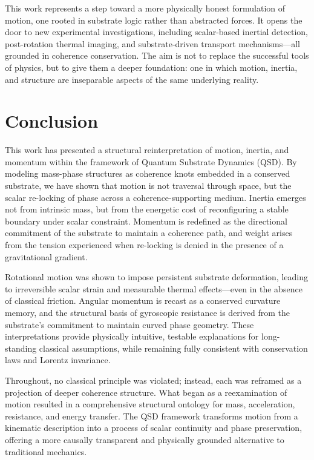 \documentclass[entropy,article,submit,pdftex,moreauthors]{Definitions/mdpi}
\begin{document}
This work represents a step toward a more physically honest formulation of motion, one rooted in substrate logic rather than abstracted forces. It opens the door to new experimental investigations, including scalar-based inertial detection, post-rotation thermal imaging, and substrate-driven transport mechanisms—all grounded in coherence conservation. The aim is not to replace the successful tools of physics, but to give them a deeper foundation: one in which motion, inertia, and structure are inseparable aspects of the same underlying reality.

\section{Conclusion}
This work has presented a structural reinterpretation of motion, inertia, and momentum within the framework of Quantum Substrate Dynamics (QSD). By modeling mass-phase structures as coherence knots embedded in a conserved substrate, we have shown that motion is not traversal through space, but the scalar re-locking of phase across a coherence-supporting medium. Inertia emerges not from intrinsic mass, but from the energetic cost of reconfiguring a stable boundary under scalar constraint. Momentum is redefined as the directional commitment of the substrate to maintain a coherence path, and weight arises from the tension experienced when re-locking is denied in the presence of a gravitational gradient.

Rotational motion was shown to impose persistent substrate deformation, leading to irreversible scalar strain and measurable thermal effects—even in the absence of classical friction. Angular momentum is recast as a conserved curvature memory, and the structural basis of gyroscopic resistance is derived from the substrate's commitment to maintain curved phase geometry. These interpretations provide physically intuitive, testable explanations for long-standing classical assumptions, while remaining fully consistent with conservation laws and Lorentz invariance.

Throughout, no classical principle was violated; instead, each was reframed as a projection of deeper coherence structure. What began as a reexamination of motion resulted in a comprehensive structural ontology for mass, acceleration, resistance, and energy transfer. The QSD framework transforms motion from a kinematic description into a process of scalar continuity and phase preservation, offering a more causally transparent and physically grounded alternative to traditional mechanics.
\end{document}
